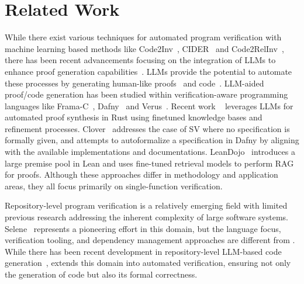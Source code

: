 \section{Related Work}
 While there exist various techniques for automated program verification with machine learning based methods like Code2Inv~\cite{si2020code2inv}, CIDER~\cite{liu2022learning} and Code2RelInv~\cite{wang2022learning}, there has been recent advancements focusing on the integration of LLMs to enhance proof generation capabilities~\cite{wen2024enchanting}. LLMs provide the potential to automate these processes by generating human-like proofs~\cite{wen2024enchanting} and code~\cite{li2024guiding}. LLM-aided proof/code generation has been studied within verification-aware programming languages like Frama-C~\cite{kirchner2015frama}, Dafny~\cite{leino2010dafny} and Verus~\cite{lattuada2023verus}. Recent work \autoverus ~\cite{yang2024autoverus} leverages LLMs for automated proof synthesis in Rust using finetuned knowledge bases and refinement processes. Clover~\cite{sun2024clover} addresses the case of SV where no specification is formally given, and attempts to autoformalize a specification in Dafny by aligning with the available implementations and documentations. LeanDojo~\cite{yang2023leandojo} introduces a large premise pool in Lean and uses fine-tuned retrieval models to perform RAG for proofs. Although these approaches differ in methodology and application areas, they all focus primarily on single-function verification. 

 Repository-level program verification is a relatively emerging field with limited previous research addressing the inherent complexity of large software systems. Selene~\cite{zhang2024selene} represents a pioneering effort in this domain, but the language focus, verification tooling, and dependency management approaches are different from \ragverus. While there has been recent development in repository-level LLM-based code generation~\cite{liao20243}, \ragverus extends this domain into automated verification, ensuring not only the generation of code but also its formal correctness.